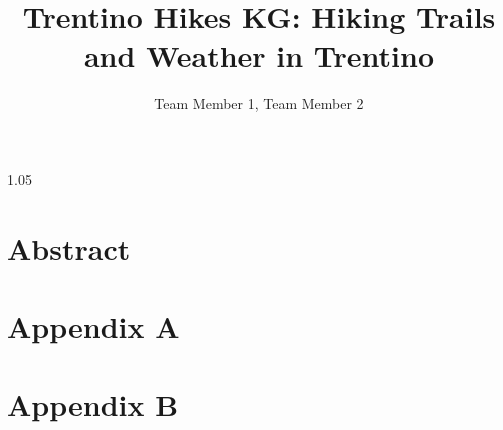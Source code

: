 \documentclass{knowdive}
\title{Trentino Hikes KG: Hiking Trails and Weather in Trentino}
\author{Team Member 1, Team Member 2}
\begin{document}
\maketitle
\begin{sloppypar}
\large
\begin{spacing}{1.05}

\section*{Abstract}






%



% 

















\newpage
\appendix

\section{Appendix A}


\section{Appendix B}


\end{spacing}
\end{sloppypar}
\end{document}
